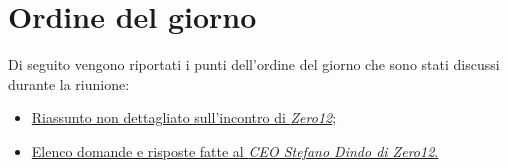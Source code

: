 \clearpage
\section{Ordine del giorno}
Di seguito vengono riportati i punti dell’ordine del giorno che sono stati discussi durante la riunione:
\begin{itemize}
	\item \hyperref[sec:riassunto]{Riassunto non dettagliato sull'incontro di  \emph{Zero12};}
	\item \hyperref[sec:elenco_domande]{Elenco domande e risposte fatte al \emph{CEO Stefano Dindo di Zero12}.}
\end{itemize}